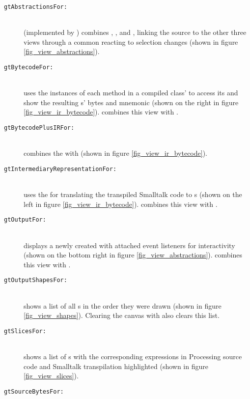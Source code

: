 \begin{description}
\item[\texttt{gtAbstractionsFor:}] \hfill \\
	(implemented by ) combines , ,  and , linking the source to the other three views through a common  reacting to selection changes (shown in figure \ref{fig_view_abstractions}).
\item[\texttt{gtBytecodeFor:}] \hfill \\
	uses the  instances of each method in a compiled class'  to access its  and show the resulting s' bytes and mnemonic (shown on the right in figure \ref{fig_view_ir_bytecode}).  combines this view with .
\item[\texttt{gtBytecodePlusIRFor:}] \hfill \\
	combines the  with  (shown in figure \ref{fig_view_ir_bytecode}).
\item[\texttt{gtIntermediaryRepresentationFor:}] \hfill \\
	uses the  for translating the transpiled Smalltalk code to s (shown on the left in figure \ref{fig_view_ir_bytecode}).  combines this view with .
\item[\texttt{gtOutputFor:}] \hfill \\
	displays a newly created  with attached event listeners for interactivity (shown on the bottom right in figure \ref{fig_view_abstractions}).  combines this view with .
\item[\texttt{gtOutputShapesFor:}] \hfill \\
	shows a list of all s in the order they were drawn (shown in figure \ref{fig_view_shapes}). Clearing the canvas with  also clears this list.
\item[\texttt{gtSlicesFor:}] \hfill \\
	shows a list of s with the corresponding expressions in Processing source code and Smalltalk transpilation highlighted (shown in figure \ref{fig_view_slices}).
\item[\texttt{gtSourceBytesFor:}] \hfill \\

\end{description}
